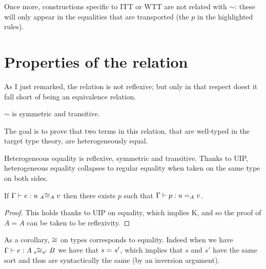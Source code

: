 Once more, constructions specific to \acrshort{ITT} or \acrshort{WTT} are not
related with \(\sim\): these will only appear in the equalities that are
transported (the \(p\) in the highlighted rules).

\section{Properties of the relation}

As I just remarked, the relation is not reflexive; but only in that respect
doest it fall short of being an equivalence relation.

\begin{lemma}
  $\sim$ is symmetric and transitive.
\end{lemma}


The goal is to prove that two terms in this relation, that are well-typed in the
target type theory, are heterogeneously equal.

Heterogeneous equality is reflexive, symmetric and transitive.
Thanks to \acrshort{UIP}, heterogeneous equality collapses to regular equality
when taken on the same type on both sides.

\begin{lemma}
  If $\isterm{\Ga}{e}{\Heq{A}{u}{A}{v}}$
  then there exists $p$ such that $\isterm{\Ga}{p}{\Eq{A}{u}{v}}$.
\end{lemma}

\begin{proof}
  This holds thanks to \acrshort{UIP} on equality, which implies K, and so the
  proof of $A = A$ can be taken to be reflexivity.
\end{proof}

\begin{remark}
  As a corollary, $\Heqs$ on types corresponds to equality.
  Indeed when we have $\isterm{\Ga}{e}{\Heq{s}{A}{s'}{B}}$ we have
  that $\Eq{}{s}{s'}$, which implies that $s$ and $s'$ have the same sort
  and thus are syntactically the same (by an inversion argument).
\end{remark}

